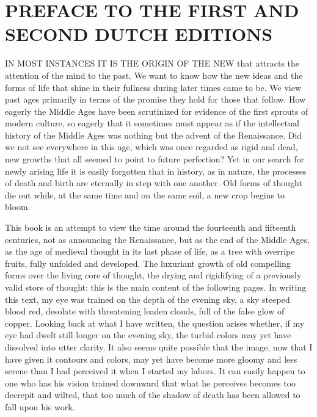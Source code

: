 \chapter{PREFACE TO THE FIRST AND SECOND DUTCH EDITIONS}

IN MOST INSTANCES IT IS THE ORIGIN OF THE NEW that attracts the
attention of the mind to the past. We want to know how the new ideas and
the forms of life that shine in their fullness during later times came
to be. We view past ages primarily in terms of the promise they hold for
those that follow. How eagerly the Middle Ages have been scrutinized for
evidence of the first sprouts of modern culture, so eagerly that it
sometimes must appear as if the intellectual history of the Middle Ages
was nothing but the advent of the Renaissance. Did we not see everywhere
in this age, which was once regarded as rigid and dead, new growths that
all seemed to point to future perfection? Yet in our search for newly
arising life it is easily forgotten that in history, as in nature, the
processes of death and birth are eternally in step with one another. Old
forms of thought die out while, at the same time and on the same soil, a
new crop begins to bloom.

This book is an attempt to view the time around the fourteenth and
fifteenth centuries, not as announcing the Renaissance, but as the end
of the Middle Ages, as the age of medieval thought in its last phase of
life, as a tree with overripe fruits, fully unfolded and developed. The
luxuriant growth of old compelling forms over the living core of
thought, the drying and rigidifying of a previously valid store of
thought: this is the main content of the following pages. In writing
this text, my eye was trained on the depth of the evening sky, a sky
steeped blood red, desolate with threatening leaden clouds, full of the
false glow of copper. Looking back at what I have written, the question
arises whether, if my eye had dwelt still longer on the evening sky, the
turbid colors may yet have dissolved into utter clarity. It also seems
quite possible that the image, now that I have given it contours and
colors, may yet have become more gloomy and less serene than I had
perceived it
\protect\hypertarget{06_PREFACE_TO_THE_DUTCH_EDITION.xhtmlux5cux23page_xx}{}{}when
I started my labors. It can easily happen to one who has his vision
trained downward that what he perceives becomes too decrepit and wilted,
that too much of the shadow of death has been allowed to fall upon his
work.

